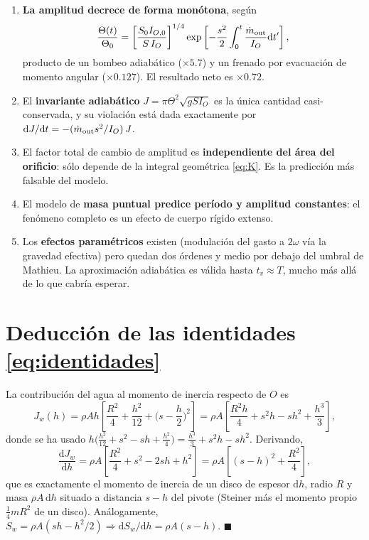 \documentclass[11pt,a4paper]{article}
\newcommand{\dd}{\mathrm{d}}
\begin{document}
\begin{enumerate}[leftmargin=*,itemsep=4pt]
\item \textbf{La amplitud decrece de forma monótona}, según
\[
\frac{\Theta(t)}{\Theta_0}=\left[\frac{S_0I_{O,0}}{S\,I_O}\right]^{1/4}
\exp\left[-\frac{s^2}{2}\int_0^t\frac{\dot m_{\rm out}}{I_O}\dd t'\right],
\]
producto de un bombeo adiabático ($\times5.7$) y un frenado por evacuación de momento angular
($\times0.127$). El resultado neto es $\times 0.72$.

\item El \textbf{invariante adiabático} $J=\pi\Theta^2\sqrt{gSI_O}$ es la única cantidad
casi-conservada, y su violación está dada exactamente por
$\dd J/\dd t = -(\dot m_{\rm out}s^2/I_O)\,J$.

\item El factor total de cambio de amplitud es \textbf{independiente del área del orificio}:
sólo depende de la integral geométrica \eqref{eq:K}. Es la predicción más falsable del modelo.

\item El modelo de \textbf{masa puntual predice período y amplitud constantes}: el fenómeno
completo es un efecto de cuerpo rígido extenso.

\item Los \textbf{efectos paramétricos} existen (modulación del gasto a $2\omega$ vía la gravedad
efectiva) pero quedan dos órdenes y medio por debajo del umbral de Mathieu. La aproximación
adiabática es válida hasta $t_v\approx T$, mucho más allá de lo que cabría esperar.
\end{enumerate}

\appendix
\section{Deducción de las identidades \eqref{eq:identidades}}

La contribución del agua al momento de inercia respecto de $O$ es
\begin{equation}
J_w(h) = \rho A h\left[\frac{R^2}{4}+\frac{h^2}{12}+\Big(s-\frac h2\Big)^2\right]
= \rho A\left[\frac{R^2 h}{4} + s^2 h - s h^2 + \frac{h^3}{3}\right],
\end{equation}
donde se ha usado $h\big(\frac{h^2}{12}+s^2-sh+\frac{h^2}{4}\big)
= \frac{h^3}{3}+s^2h-sh^2$. Derivando,
\begin{equation}
\frac{\dd J_w}{\dd h} = \rho A\left[\frac{R^2}{4}+s^2-2sh+h^2\right]
= \rho A\left[(s-h)^2+\frac{R^2}{4}\right],
\end{equation}
que es exactamente el momento de inercia de un disco de espesor $\dd h$, radio $R$ y masa
$\rho A\,\dd h$ situado a distancia $s-h$ del pivote (Steiner más el momento propio
$\frac14 m R^2$ de un disco). Análogamente,
$S_w=\rho A(sh-h^2/2)\Rightarrow \dd S_w/\dd h = \rho A(s-h)$. $\blacksquare$
\end{document}
